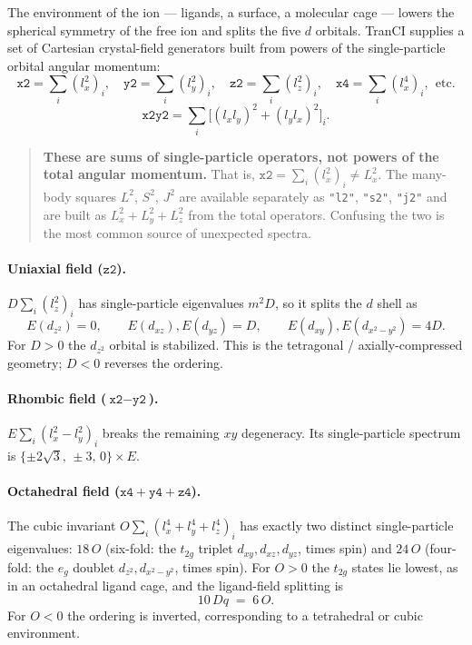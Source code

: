 \documentclass[11pt,a4paper]{article}
\newcommand{\op}[1]{\texttt{#1}}
\begin{document}
The environment of the ion --- ligands, a surface, a molecular cage --- lowers
the spherical symmetry of the free ion and splits the five $d$ orbitals.  TranCI
supplies a set of Cartesian crystal-field generators built from powers of the
single-particle orbital angular momentum:
\begin{equation}
  \op{x2}=\sum_i (l_x^2)_i,\quad
  \op{y2}=\sum_i (l_y^2)_i,\quad
  \op{z2}=\sum_i (l_z^2)_i,\quad
  \op{x4}=\sum_i (l_x^4)_i,\ \ \text{etc.}
\end{equation}
\begin{equation}
  \op{x2y2}=\sum_i \Big[ (l_xl_y)^2 + (l_yl_x)^2 \Big]_i .
\end{equation}

\begin{quote}
\textbf{These are sums of single-particle operators, not powers of the total
angular momentum.}  That is, $\op{x2}=\sum_i (l_x^2)_i \neq L_x^2$.  The
many-body squares $L^2$, $S^2$, $J^2$ are available separately as \op{"l2"},
\op{"s2"}, \op{"j2"} and are built as $L_x^2+L_y^2+L_z^2$ from the total
operators.  Confusing the two is the most common source of unexpected spectra.
\end{quote}

\paragraph{Uniaxial field ($\op{z2}$).}
$D\sum_i (l_z^2)_i$ has single-particle eigenvalues $m^2 D$, so it splits the
$d$ shell as
\begin{equation}
  E(d_{z^2})=0,\qquad
  E(d_{xz}),E(d_{yz})=D,\qquad
  E(d_{xy}),E(d_{x^2-y^2})=4D .
\end{equation}
For $D>0$ the $d_{z^2}$ orbital is stabilized.  This is the tetragonal /
axially-compressed geometry; $D<0$ reverses the ordering.

\paragraph{Rhombic field ($\op{x2}-\op{y2}$).}
$E\sum_i (l_x^2-l_y^2)_i$ breaks the remaining $xy$ degeneracy.  Its
single-particle spectrum is $\{\pm 2\sqrt{3},\,\pm 3,\,0\}\times E$.

\paragraph{Octahedral field ($\op{x4}+\op{y4}+\op{z4}$).}
The cubic invariant $O\sum_i(l_x^4+l_y^4+l_z^4)_i$ has exactly two distinct
single-particle eigenvalues: $18\,O$ (six-fold: the $t_{2g}$ triplet
$d_{xy},d_{xz},d_{yz}$, times spin) and $24\,O$ (four-fold: the $e_g$ doublet
$d_{z^2},d_{x^2-y^2}$, times spin).  For $O>0$ the $t_{2g}$ states lie lowest,
as in an octahedral ligand cage, and the ligand-field splitting is
\begin{equation}
  10\,Dq \;=\; 6\,O .
\end{equation}
For $O<0$ the ordering is inverted, corresponding to a tetrahedral or cubic
environment.
\end{document}
